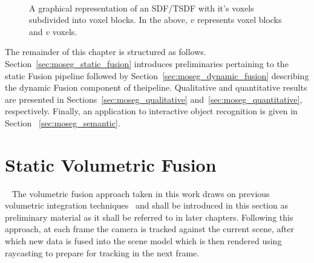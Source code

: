 \begin{figure}[!htbp]
{
  }
  \caption[TSDF split in to voxel blocks]{A graphical representation of an 
  SDF/TSDF with it's voxels subdivided into voxel blocks. In the above, \(v\) 
  represents voxel blocks and \(v\) voxels.}
~\label{figure:voxel_blocks}
\end{figure}

The remainder of this chapter is structured as follows.
Section~\ref{sec:moseg_static_fusion} introduces preliminaries pertaining to 
the static Fusion pipeline followed by Section~\ref{sec:moseg_dynamic_fusion} 
describing the dynamic Fusion component of theipeline. Qualitative and quantitative 
results are presented in Sections~\ref{sec:moseg_qualitative} and~\ref{sec:moseg_quantitative}, 
respectively. Finally, an application to interactive object recognition is given in Section
~\ref{sec:moseg_semantic}.

\section{Static Volumetric Fusion}
~\label{sec:moseg_static_fusion}
The volumetric fusion approach taken in this work draws on previous volumetric
integration techniques~\cite{Curless1996, Newcombe2011, NieBner2013, Prisacariu2014} 
and shall be introduced in this section as preliminary material as it shall be
referred to in later chapters. Following this approach, at each frame the camera
is tracked against the current scene, after which new data is fused into the
scene model which is then rendered using raycasting to prepare for tracking in
the next frame.

